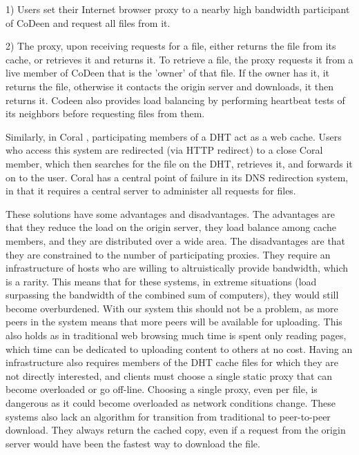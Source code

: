 1) Users set their Internet browser proxy to a nearby high bandwidth participant of CoDeen and request all files from it.

2) The proxy, upon receiving requests for a file, either returns the file from its cache, or retrieves it and returns it.  To retrieve a file, the proxy requests it from a live member of CoDeen that is the 'owner' of that file.  If the owner has it, it returns the file, otherwise it contacts the origin server and downloads, it then returns it.  Codeen also provides load balancing by performing heartbeat tests of its neighbors before requesting files from them.  

Similarly, in Coral \cite{coral}, participating members of a DHT act as a web cache.  Users who access this system are redirected (via HTTP redirect) to a close Coral member, which then searches for the file on the DHT, retrieves it, and forwards it on to the user.  Coral has a central point of failure in its DNS redirection system, in that it requires a central server to administer all requests for files.

These solutions have some advantages and disadvantages.  The advantages are that they reduce the load on the origin server, they load balance among cache members, and they are distributed over a wide area.  The disadvantages are that they are constrained to the number of participating proxies. They require an infrastructure of hosts who are willing to altruistically provide bandwidth, which is a rarity.  This means that for these systems, in extreme situations (load surpassing the bandwidth of the combined sum of computers), they would still become overburdened.  With our system this should not be a problem, as more peers in the system means that more peers will be available for uploading.  This also holds as in traditional web browsing much time is spent only reading pages, which time can be dedicated to uploading content to others at no cost.  Having an infrastructure also requires members of the DHT cache files for which they are not directly interested, and clients must choose a single static proxy that can become overloaded or go off-line.  Choosing a single proxy, even per file, is dangerous as it could become overloaded as network conditions change.  These systems also lack an algorithm for transition from traditional to peer-to-peer download.  They always return the cached copy, even if a request from the origin server would have been the fastest way to download the file.    

